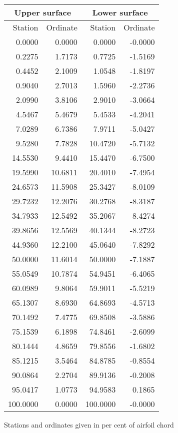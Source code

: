 \documentclass[11pt]{book}
\begin{document}
 \hspace{4mm}
 \begin{tabular}{|r|r|r|r|} \hline 
 \multicolumn{2}{|c|}{Upper surface} & \multicolumn{2}{|c|}{Lower surface} \\
 \hline
 Station & Ordinate & Station & Ordinate \\
 \hline
0.0000 & 0.0000 & 0.0000 & -0.0000 \\
0.2275 & 1.7173 & 0.7725 & -1.5169 \\
0.4452 & 2.1009 & 1.0548 & -1.8197 \\
0.9040 & 2.7013 & 1.5960 & -2.2736 \\
2.0990 & 3.8106 & 2.9010 & -3.0664 \\
4.5467 & 5.4679 & 5.4533 & -4.2041 \\
7.0289 & 6.7386 & 7.9711 & -5.0427 \\
9.5280 & 7.7828 & 10.4720 & -5.7132 \\
14.5530 & 9.4410 & 15.4470 & -6.7500 \\
19.5990 & 10.6811 & 20.4010 & -7.4954 \\
24.6573 & 11.5908 & 25.3427 & -8.0109 \\
29.7232 & 12.2076 & 30.2768 & -8.3187 \\
34.7933 & 12.5492 & 35.2067 & -8.4274 \\
39.8656 & 12.5569 & 40.1344 & -8.2723 \\
44.9360 & 12.2100 & 45.0640 & -7.8292 \\
50.0000 & 11.6014 & 50.0000 & -7.1887 \\
55.0549 & 10.7874 & 54.9451 & -6.4065 \\
60.0989 & 9.8064 & 59.9011 & -5.5219 \\
65.1307 & 8.6930 & 64.8693 & -4.5713 \\
70.1492 & 7.4775 & 69.8508 & -3.5886 \\
75.1539 & 6.1898 & 74.8461 & -2.6099 \\
80.1444 & 4.8659 & 79.8556 & -1.6802 \\
85.1215 & 3.5464 & 84.8785 & -0.8554 \\
90.0864 & 2.2704 & 89.9136 & -0.2008 \\
95.0417 & 1.0773 & 94.9583 & 0.1865 \\
100.0000 & 0.0000 & 100.0000 & -0.0000 \\
 \hline 
 \end{tabular}
 \vspace{8mm}

Stations and ordinates given in per cent of airfoil chord
\end{document}
